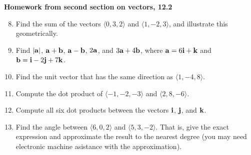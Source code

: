 \documentclass[12pt]{article}
\newcommand{\bfa}{{\bf a}}    %
\newcommand{\bfb}{{\bf b}}    %
\newcommand{\bfi}{{\bf i}}    %
\newcommand{\bfj}{{\bf j}}    %
\newcommand{\bfk}{{\bf k}}    %
\begin{document}
{\bf {\color{Maroon}Homework from second section on vectors, 12.2}}
\begin{enumerate}  %
\setcounter{enumi}{7}

\item Find the sum of the vectors $\langle 0,3,2\rangle$ and $\langle 1,-2,3\rangle$, and illustrate this geometrically.

\item Find $|\bfa|$, $\bfa+\bfb$, $\bfa-\bfb$, $2\bfa$, and $3\bfa+4\bfb$, where
  $\bfa= 6\bfi+\bfk$ and $\bfb=\bfi-2\bfj+7\bfk$.

\item Find the unit vector that has the same direction as $\langle 1,-4,8\rangle$.

\item Compute the dot product of $\langle -1,-2,-3\rangle$ and $\langle 2,8,-6\rangle$.

\item Compute all six dot products between the vectors $\bfi$, $\bfj$, and $\bfk$.

\item Find the angle between $\langle 6,0,2\rangle$ and $\langle 5,3,-2\rangle$.
  That is, give the exact expression and approximate the result to the nearest degree (you may need electronic machine asistance with
  the approximation).


\end{enumerate}
\end{document}
